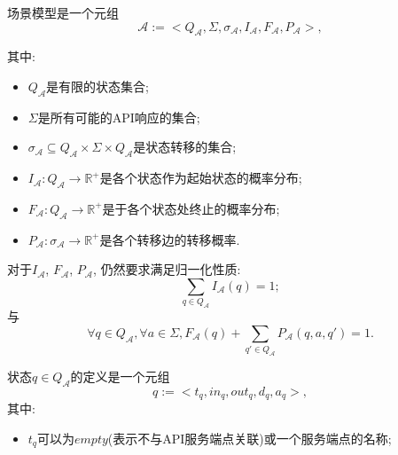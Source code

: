             \begin{definition}
                \label{def:our}
                场景模型是一个元组
                \begin{equation}
                     \mathcal{A} := <Q_{\mathcal{A}}, \Sigma, \sigma_{\mathcal{A}}, I_{\mathcal{A}}, F_{\mathcal{A}}, P_{\mathcal{A}}>,
                \end{equation}
                
                其中:
                \begin{itemize}
                    \item $Q_{\mathcal{A}}$是有限的状态集合;
                    
                    \item $\Sigma$是所有可能的API响应的集合;
                    
                    \item $\sigma_{\mathcal{A}} \subseteq Q_{\mathcal{A}} \times \Sigma \times Q_{\mathcal{A}}$是状态转移的集合;
                    
                    \item $I_{\mathcal{A}} : Q_{\mathcal{A}} \to \mathbb{R}^{+}$是各个状态作为起始状态的概率分布;
                    
                    \item $F_{\mathcal{A}} : Q_{\mathcal{A}} \to \mathbb{R}^{+}$是于各个状态处终止的概率分布;
                    
                    \item $P_{\mathcal{A}}: \sigma_{\mathcal{A}} \to \mathbb{R}^{+}$是各个转移边的转移概率.
                \end{itemize}
                
                对于$I_{\mathcal{A}}$, $F_{\mathcal{A}}$, $P_{\mathcal{A}}$, 仍然要求满足归一化性质:
                \begin{equation}
                    \sum_{q \in Q_{\mathcal{A}}} I_{\mathcal{A}}(q) = 1;
                \end{equation}
                与
                \begin{equation}
                    \forall q \in Q_{\mathcal{A}}, \forall a \in \Sigma, F_{\mathcal{A}}(q) + \sum_{q' \in Q_{\mathcal{A}}} P_{\mathcal{A}}(q,a,q') = 1.
                \end{equation}
                
                状态$q \in Q_{\mathcal{A}}$的定义是一个元组
                \begin{equation}
                    q := <t_q, in_q, out_q, d_q, a_q>,
                \end{equation}
                其中:
                \begin{itemize}
                    \item $t_q$可以为$empty$(表示不与API服务端点关联)或一个服务端点的名称;
                    

\end{itemize}
\end{definition}
